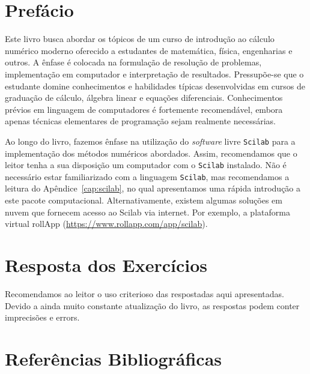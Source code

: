 \documentclass[12pt,a4paper]{book}
\begin{document}
\chapter*{Prefácio}

Este livro busca abordar os tópicos de um curso de introdução ao cálculo numérico moderno oferecido a estudantes de matemática, física, engenharias e outros. A ênfase é colocada na formulação de resolução de problemas, implementação em computador e interpretação de resultados. Pressupõe-se que o estudante domine conhecimentos e habilidades típicas desenvolvidas em cursos de graduação de cálculo, álgebra linear e equações diferenciais. Conhecimentos prévios em linguagem de computadores é fortemente recomendável, embora apenas técnicas elementares de programação sejam realmente necessárias.

\ifisscilab
Ao longo do livro, fazemos ênfase na utilização do \emph{software} livre \verb+Scilab+ para a implementação dos métodos numéricos abordados. Assim, recomendamos que o leitor tenha a sua disposição um computador com o \verb+Scilab+ instalado. Não é necessário estar familiarizado com a linguagem \verb+Scilab+, mas recomendamos a leitura do Apêndice~\ref{cap:scilab}, no qual apresentamos uma rápida introdução a este pacote computacional. Alternativamente, existem algumas soluções em nuvem que fornecem acesso ao Scilab via internet. Por exemplo, a plataforma virtual rollApp (\url{https://www.rollapp.com/app/scilab}).
\fi

\tableofcontents

\mainmatter










\ifisscilab
\appendix

\fi

\chapter*{Resposta dos Exercícios}
Recomendamos ao leitor o uso criterioso das respostadas aqui apresentadas. Devido a ainda muito constante atualização do livro, as respostas podem conter imprecisões e errors.
\shipoutAnswer  

\nocite{*}

\begingroup
\chapter*{Referências Bibliográficas}
\renewcommand{\chapter}[2]{}

\endgroup

\clearpage
{}
\printindex
\end{document}
